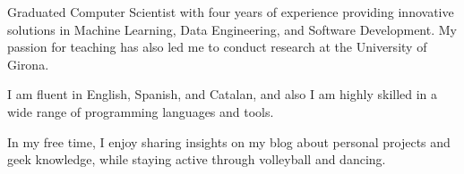 

\begin{cvparagraph}


Graduated Computer Scientist with four years of experience providing innovative
solutions in Machine Learning, Data Engineering, and Software Development. My
passion for teaching has also led me to conduct research at the University of
Girona.

I am fluent in English, Spanish, and Catalan, and also I am highly skilled in a
wide range of programming languages and tools.

In my free time, I enjoy sharing insights on my blog about personal projects
and geek knowledge, while staying active through volleyball and dancing.


\end{cvparagraph}
